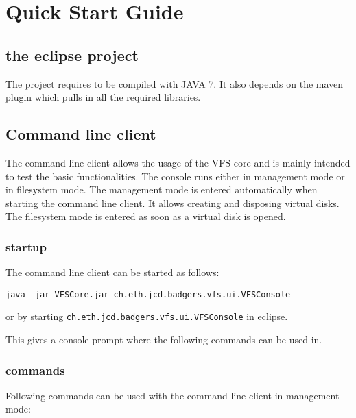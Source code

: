 

\section{Quick Start Guide}


\subsection{the eclipse project}
The project requires to be compiled with JAVA 7. It also depends on the maven
plugin which pulls in all the required libraries.

\subsection{Command line client}

The command line client allows the usage of the VFS core and is mainly intended
to test the basic functionalities. The console runs either in  management mode
or in filesystem mode. The management mode is entered automatically when
starting the command line client. It allows creating and disposing virtual
disks. The filesystem mode is entered as soon as a virtual disk is opened.


\subsubsection{startup}
The command line client can be started as follows:

\begin{verbatim}
java -jar VFSCore.jar ch.eth.jcd.badgers.vfs.ui.VFSConsole
\end{verbatim}

or by starting \verb|ch.eth.jcd.badgers.vfs.ui.VFSConsole| in eclipse.



This gives a console prompt where the following commands can be used in.

\subsubsection{commands}
Following commands can be used with the command line client in management mode:

